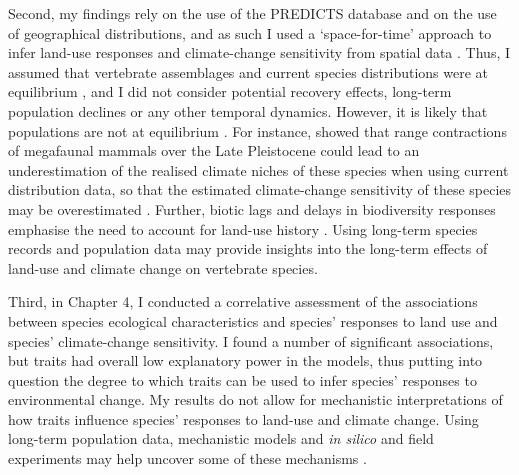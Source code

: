 Second, my findings rely on the use of the PREDICTS database and on the use of geographical distributions, and as such I used a `space-for-time' approach  to infer land-use responses and climate-change sensitivity from spatial data \citep{Blois2013}. Thus, I assumed that vertebrate assemblages and current species distributions were at equilibrium \citep{DePalma2018}, and I did not consider potential recovery effects, long-term population declines or any other temporal dynamics. However, it is likely that populations are not at equilibrium \citep{DePalma2018, Damgaard2019}. For instance, \citet{Sales2022} showed that range contractions of megafaunal mammals over the Late Pleistocene could lead to an underestimation of the realised climate niches of these species when using current distribution data, so that the estimated climate-change sensitivity of these species may be overestimated \citep{Sales2022}. Further, biotic lags and delays in biodiversity responses emphasise the need to account for land-use history \citep{DePalma2018, LeProvost2020}. Using long-term species records and population data may provide insights into the long-term effects of land-use and climate change on vertebrate species. 

Third, in Chapter 4, I conducted a correlative assessment of the associations between species ecological characteristics and species' responses to land use and species' climate-change sensitivity. I found a number of significant associations, but traits had overall low explanatory power in the models, thus putting into question the degree to which traits can be used to infer species' responses to environmental change. My results do not allow for mechanistic interpretations of how traits influence species' responses to land-use and climate change. Using long-term population data, mechanistic models and \textit{in silico} and field experiments may help uncover some of these mechanisms \citep{Ries2004, Boult2021}.

